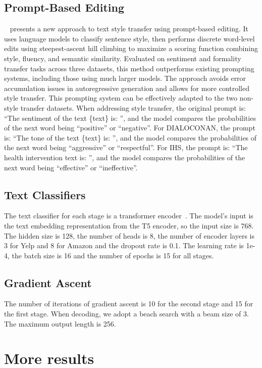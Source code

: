 \documentclass{article}
\begin{document}
\subsection{Prompt-Based Editing}
~\citet{luo-etal-2023-prompt} presents a new approach to text style transfer using prompt-based editing. It uses language models to classify sentence style, then performs discrete word-level edits using steepest-ascent hill climbing to maximize a scoring function combining style, fluency, and semantic similarity. Evaluated on sentiment and formality transfer tasks across three datasets, this method outperforms existing prompting systems, including those using much larger models. The approach avoids error accumulation issues in autoregressive generation and allows for more controlled style transfer. This prompting system can be effectively adapted to the two non-style transfer datasets. When addressing style transfer, the original prompt is: ``The sentiment of the text \{text\} is: '', and the model compares the probabilities of the next word being ``positive'' or ``negative''. For DIALOCONAN, the prompt is: “The tone of the text \{text\} is: '', and the model compares the probabilities of the next word being ``aggressive'' or ``respectful''. For IHS, the prompt is: ``The health intervention {text} is: '', and the model compares the probabilities of the next word being ``effective'' or ``ineffective''.
\subsection{Text Classifiers}
The text classifier for each stage is a transformer encoder~\cite{vaswani2017attention}. The model's input is the text embedding representation from the T5 encoder, so the input size is 768. The hidden size is 128, the number of heads is 8, the number of encoder layers is 3 for Yelp and 8 for Amazon and the dropout rate is 0.1. The learning rate is 1e-4, the batch size is 16 and the number of epochs is 15 for all stages.
\subsection{Gradient Ascent}
The number of iterations of gradient ascent is 10 for the second stage and 15 for the first stage. When decoding, we adopt a beach search with a beam size of 3. The maximum output length is 256.
\section{More results}\label{app:more-rslt}
\end{document}
